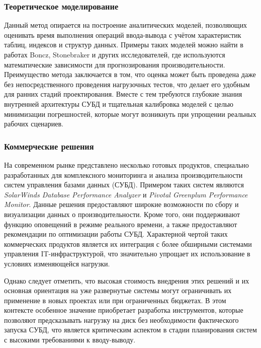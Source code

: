 \subsubsection{Теоретическое моделирование}
Данный метод опирается на построение аналитических моделей, позволяющих оценивать время выполнения операций ввода-вывода с учётом характеристик таблиц, 
индексов и структур данных. Примеры таких моделей можно найти в работах Boncz, Stonebraker и других исследователей, 
где используются математические зависимости для прогнозирования производительности. Преимущество метода заключается в том, 
что оценка может быть проведена даже без непосредственного проведения нагрузочных тестов, что делает его удобным для ранних 
стадий проектирования. Вместе с тем требуются глубокие знания внутренней архитектуры СУБД и тщательная калибровка моделей с 
целью минимизации погрешностей, которые могут возникнуть при упрощении реальных рабочих сценариев. \cite{Poltavtseva2024}

\subsubsection{Коммерческие решения}
На современном рынке представлено несколько готовых продуктов, специально разработанных для комплексного мониторинга 
и анализа производительности систем управления базами данных (СУБД). Примером таких систем являются 
\textit{SolarWinds Database Performance Analyzer} и \textit{Pivotal Greenplum Performance Monitor}. 
Данные решения предоставляют широкие возможности по сбору и визуализации данных о производительности. Кроме того, 
они поддерживают функцию оповещений в режиме реального времени, а также предоставляют рекомендации по оптимизации работы СУБД. \cite{Varlamov2023}
Характерной чертой таких коммерческих продуктов является их интеграция с более обширными системами управления IT-инфраструктурой, 
что значительно упрощает их использование в условиях изменяющейся нагрузки.

Однако следует отметить, что высокая стоимость внедрения этих решений и их основная ориентация на уже развернутые системы могут 
ограничивать их применение в новых проектах или при ограниченных бюджетах. В этом контексте особенное значение приобретает 
разработка инструментов, которые позволяют предсказывать нагрузку на диск без необходимости фактического запуска СУБД, 
что является критическим аспектом в стадии планирования систем с высокими требованиями к вводу-выводу.

